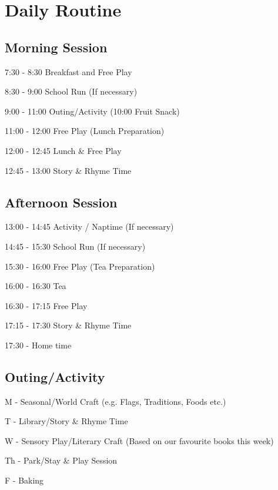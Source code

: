 

\section{Daily Routine}

\subsection{Morning Session}

7:30 - 8:30 Breakfast and Free Play

8:30 - 9:00 School Run (If necessary) 

9:00 - 11:00 Outing/Activity (10:00 Fruit Snack)

11:00 - 12:00 Free Play (Lunch Preparation)

12:00 - 12:45 Lunch \& Free Play

12:45 - 13:00 Story \& Rhyme Time

\subsection{Afternoon Session}

13:00 - 14:45 Activity / Naptime (If necessary)

14:45 - 15:30 School Run (If necessary)

15:30 - 16:00 Free Play (Tea Preparation)

16:00 - 16:30 Tea

16:30 - 17:15 Free Play

17:15 - 17:30 Story \& Rhyme Time

17:30 - Home time

\subsection{Outing/Activity}

M - Seasonal/World Craft (e.g. Flags, Traditions, Foods etc.)

T - Library/Story \& Rhyme Time

W - Sensory Play/Literary Craft (Based on our favourite books this week)

Th - Park/Stay \& Play Session

F - Baking


